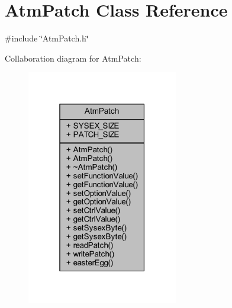 \hypertarget{class_atm_patch}{}\section{Atm\+Patch Class Reference}
\label{class_atm_patch}


{\ttfamily \#include \char`\"{}Atm\+Patch.\+h\char`\"{}}



Collaboration diagram for Atm\+Patch\+:
\nopagebreak
\begin{figure}[H]
\begin{center}
\leavevmode
\includegraphics[width=187pt]{d5/d25/class_atm_patch__coll__graph}
\end{center}
\end{figure}
